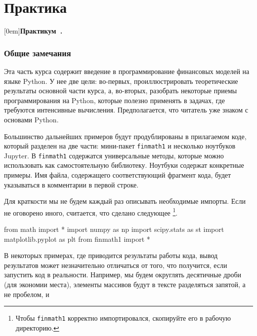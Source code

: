 \part{Практика}
[0em]{}{\textbf{Практикум\ \thecontentslabel.}\hspace{2mm}}{}{\dotfill\contentspage}
\setcounter{chapter}{0}
\renewcommand{\theHchapter}{P\arabic{chapter}}%

\section*{Общие замечания}
Эта часть курса содержит введение в программирование финансовых моделей на языке Python.
У нее две цели: во-первых, проиллюстрировать теоретические результаты основной части курса, а, во-вторых, разобрать некоторые приемы программирования на Python, которые полезно применять в задачах, где требуются интенсивные вычисления.
Предполагается, что читатель уже знаком с основами Python.

Большинство дальнейших примеров будут продублированы в прилагаемом коде, который разделен на две части: мини-пакет \verb"finmath1" и несколько ноутбуков Jupyter.
В \verb"finmath1" содержатся универсальные методы, которые можно использовать как самостоятельную библиотеку.
Ноутбуки содержат конкретные примеры.
Имя файла, содержащего соответствующий фрагмент кода, будет указываться в комментарии в первой строке.

Для краткости мы не будем каждый раз описывать необходимые импорты. Если не оговорено иного, считается, что сделано следующее%
\footnote{Чтобы \verb"finmath1" корректно импортировался, скопируйте его в рабочую директорию.}.
\begin{python}
from math import *
import numpy as np
import scipy.stats as st
import matplotlib.pyplot as plt
from finmath1 import *
\end{python}

В некоторых примерах, где приводится результаты работы кода, вывод результатов может незначительно отличаться от того, что получится, если запустить код в реальности. Например, мы будем округлять десятичные дроби (для экономии места), элементы массивов будут в тексте разделяться запятой, а не пробелом, и \tp

